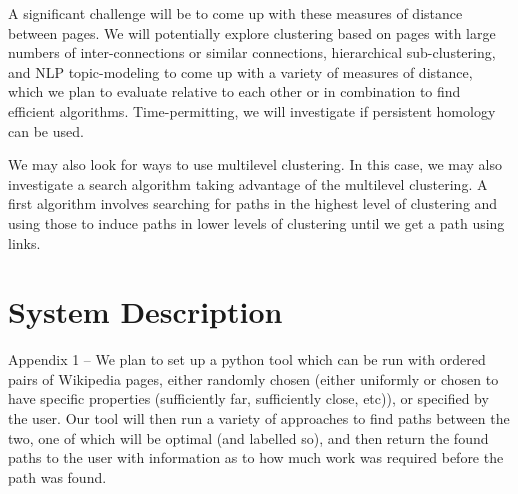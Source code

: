 \documentclass[11pt]{article}
\begin{document}
{A significant challenge will be to come up with these measures of distance between pages. We will potentially explore clustering based on pages with large numbers of inter-connections or similar connections, hierarchical sub-clustering, and NLP topic-modeling to come up with a variety of measures of distance, which we plan to evaluate relative to each other or in combination to find efficient algorithms.  Time-permitting, we will investigate if persistent homology can be used.

We may also look for ways to use multilevel clustering.  In this case, we may also investigate a search algorithm taking advantage of the multilevel clustering.  A first algorithm involves searching for paths in the highest level of clustering and using those to induce paths in lower levels of clustering until we get a path using links.  %




\appendix

\section{System Description}

 Appendix 1 – We plan to set up a python tool which can be run with ordered pairs of Wikipedia pages, either randomly chosen (either uniformly or chosen to have specific properties (sufficiently far, sufficiently close, etc)), or specified by the user. Our tool will then run a variety of approaches to find paths between the two, one of which will be optimal (and labelled so), and then return the found paths to the user with information as to how much work was required before the path was found.
  
}
\end{document}
